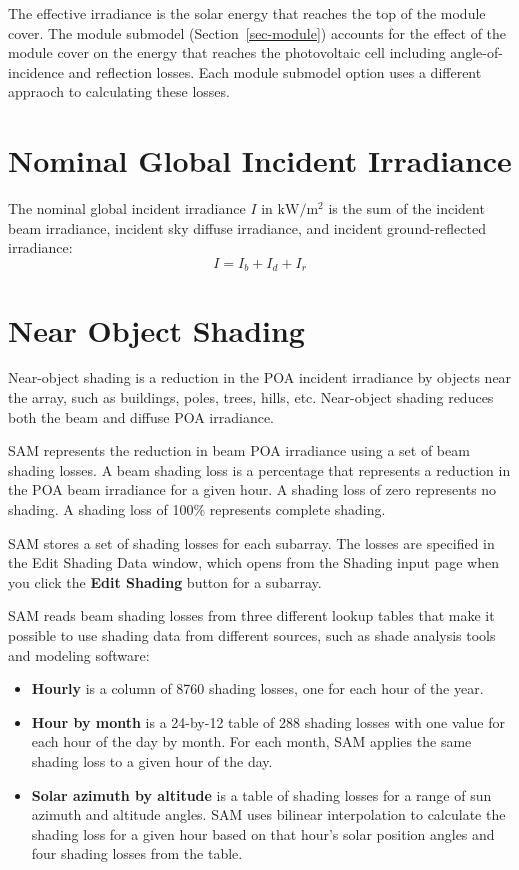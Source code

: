 \documentclass[12pt,letterpaper]{article}
\begin{document}
The effective irradiance is the solar energy that reaches the top of the module cover. The module submodel (Section~\ref{sec-module}) accounts for the effect of the module cover on the energy that reaches the photovoltaic cell including angle-of-incidence and reflection losses. Each module submodel option uses a different appraoch to calculating these losses.

\section{Nominal Global Incident Irradiance}\label{sec-nominalincidentirradiance}

The nominal global incident irradiance $I$ in $\mathrm{kW/m^2}$ is the sum of the incident beam irradiance, incident sky diffuse irradiance, and incident ground-reflected irradiance:
\begin{equation}
I = I_{b} + I_{d} + I_{r}
\end{equation}

\section{Near Object Shading}\label{sec-nearobjectshad}

Near-object shading is a reduction in the POA incident irradiance by objects near the array, such as buildings, poles, trees, hills, etc. Near-object shading reduces both the beam and diffuse POA irradiance.

SAM represents the reduction in beam POA irradiance using a set of beam shading losses. A beam shading loss is a percentage that represents a reduction in the POA beam irradiance for a given hour. A shading loss of zero represents no shading. A shading loss of 100\% represents complete shading.

SAM stores a set of shading losses for each subarray. The losses are specified in the Edit Shading Data window, which opens from the Shading input page when you click the \textbf{Edit Shading} button for a subarray.

SAM reads beam shading losses from three different lookup tables that make it possible to use shading data from different sources, such as shade analysis tools and modeling software:
\begin{itemize} 
\item \textbf{Hourly} is a column of 8760 shading losses, one for each hour of the year.
\item \textbf{Hour by month} is a 24-by-12 table of 288 shading losses with one value for each hour of the day by month. For each month, SAM applies the same shading loss to a given hour of the day.
\item \textbf{Solar azimuth by altitude} is a table of shading losses for a range of sun azimuth and altitude angles. SAM uses bilinear interpolation to calculate the shading loss for a given hour based on that hour's solar position angles and four shading losses from the table.
\end{itemize}
\end{document}

